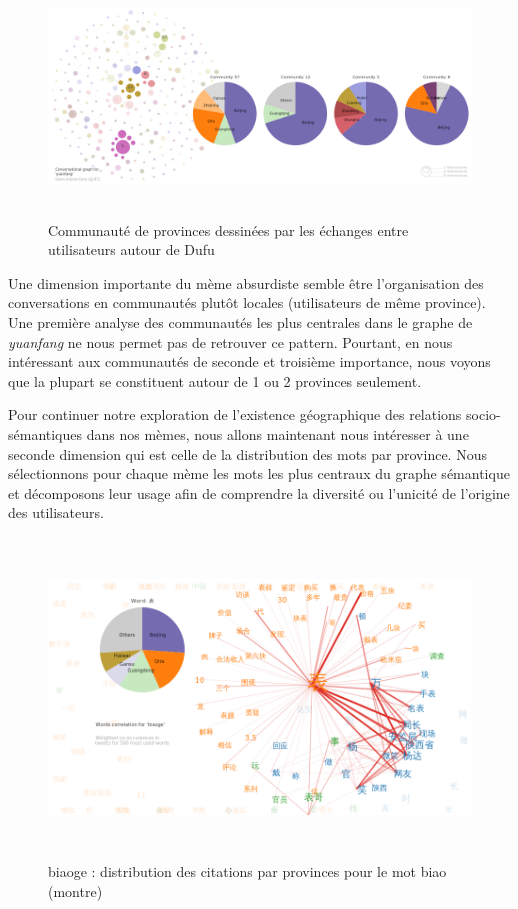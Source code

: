 \begin{figure}
    \centering
    \includegraphics[width=5.9996in,height=2.5004in]{figures/chap4/chapitre4-img58.png}
    \caption{
        Communauté de provinces dessinées par les échanges entre utilisateurs autour de Dufu
    }
    \label{fig:dufu-users-pie}
\end{figure}


Une dimension importante du mème absurdiste semble être l{\textquoteright}organisation des conversations en communautés plut\^ot locales (utilisateurs de même province). Une première analyse des communautés les plus centrales dans le graphe de \textit{yuanfang} ne nous permet pas de retrouver ce pattern. Pourtant, en nous intéressant aux communautés de seconde et troisième importance, nous voyons que la plupart se constituent autour de 1 ou 2 provinces seulement.  

Pour continuer notre exploration de l{\textquoteright}existence géographique des relations socio-sémantiques dans nos mèmes, nous allons maintenant nous intéresser \`a une seconde dimension qui est celle de la distribution des mots par province. Nous sélectionnons pour chaque mème les mots les plus centraux du graphe sémantique et décomposons leur usage afin de comprendre la diversité ou l{\textquoteright}unicité de l{\textquoteright}origine des utilisateurs. 

\begin{figure}[htbp]
  \centering
  \includegraphics[width=6.0087in,height=3.3386in]{figures/chap4/chapitre4-img60.png}
  \caption{
     biaoge : distribution des citations par provinces pour le mot biao (montre)
  }
  \label{fig:biaoge-words-pie-biao}
\end{figure}

